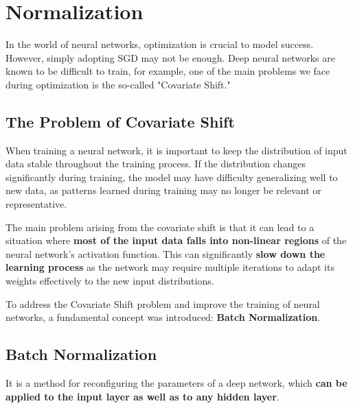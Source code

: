 \vspace{-0.5cm}
\section{Normalization}

\vspace{-0.4cm}
In the world of neural networks, optimization is crucial to model success. However, simply adopting SGD may not be enough. Deep neural networks are known to be difficult to train, for example, one of the main problems we face during optimization is the so-called "Covariate Shift."
\vspace{-0.4cm}

\subsection{The Problem of Covariate Shift}

When training a neural network, it is important to keep the distribution of input data stable throughout the training process. If the distribution changes significantly during training, the model may have difficulty generalizing well to new data, as patterns learned during training may no longer be relevant or representative.

The main problem arising from the covariate shift is that it can lead to a situation where \textbf{most of the input data falls into non-linear regions} of the neural network's activation function. This can significantly \textbf{slow down the learning process} as the network may require multiple iterations to adapt its weights effectively to the new input distributions.

To address the Covariate Shift problem and improve the training of neural networks, a fundamental concept was introduced: \textbf{Batch Normalization}.

\subsection{Batch Normalization}

It is a method for reconfiguring the parameters of a deep network, which \textbf{can be applied to the input layer as well as to any hidden layer}.

